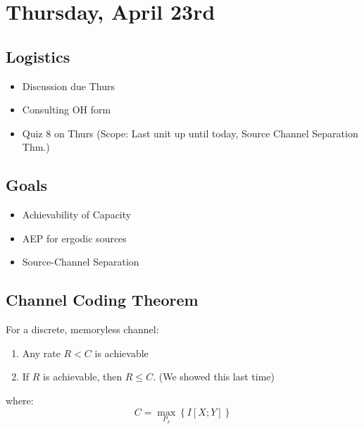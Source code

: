 \section{Thursday, April 23rd}
\subsection{Logistics}
\begin{itemize}
    \item Discussion due Thurs
    \item Consulting OH form
    \item Quiz 8 on Thurs (Scope: Last unit up until today, Source Channel Separation Thm.)
\end{itemize}

\subsection{Goals}
\begin{itemize}
    \item Achievability of Capacity
    \item AEP for ergodic sources
    \item Source-Channel Separation
\end{itemize}

\subsection{Channel Coding Theorem}
For a discrete, memoryless channel:
\begin{enumerate}
    \item Any rate $R<C$ is achievable
    \item If $R$ is achievable, then $R\leq C$. (We showed this last time)
\end{enumerate}
where:
$$
C = \max_{P_x} \left\{I[X; Y]\right\}
$$

